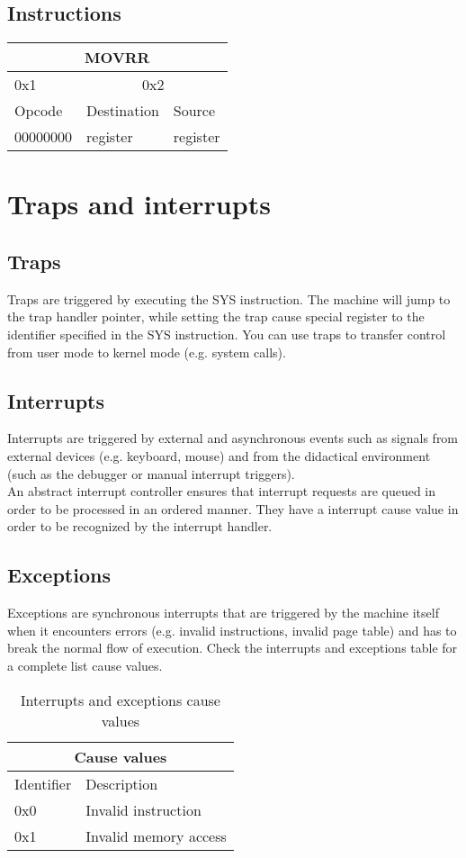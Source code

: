 \documentclass{article}
\begin{document}
\subsection{Instructions}
\begin{table}[h!]
\centering
\begin{tabular} { | p{2cm} | | p{2cm} | p{2cm} |}
  \hline
  \multicolumn{3}{|c|}{MOVRR}\\
  \hline
  0x1 & \multicolumn{2}{|c|}{0x2}\\
  \hline
  Opcode & Destination & Source\\
  00000000 & register & register\\
  \hline
\end{tabular}
\end{table}

\section{Traps and interrupts}
\subsection{Traps}
Traps are triggered by executing the SYS instruction. The machine will jump to the trap handler pointer, while setting the trap cause special register to the identifier specified in the SYS instruction. You can use traps to transfer control from user mode to kernel mode (e.g. system calls).
\subsection{Interrupts}
Interrupts are triggered by external and asynchronous events such as signals from external devices (e.g. keyboard, mouse) and from the didactical environment (such as the debugger or manual interrupt triggers). \\An abstract interrupt controller ensures that interrupt requests are queued in order to be processed in an ordered manner. They have a interrupt cause value in order to be recognized by the interrupt handler.
\subsection{Exceptions}
Exceptions are synchronous interrupts that are triggered by the machine itself when it encounters errors (e.g. invalid instructions, invalid page table) and has to break the normal flow of execution. Check the interrupts and exceptions table for a complete list cause values.
\\

\begin{table}[h!]
\centering
\begin{tabular} { | p{6cm} | p{6cm} |}
  \hline
  \multicolumn{2}{|c|}{Cause values}\\
  \hline
  Identifier & Description\\
  \hline  
  0x0 & Invalid instruction\\
  0x1 & Invalid memory access \\
  
  \hline
  
\end{tabular}
\caption{Interrupts and exceptions cause values}
\end{table}
\end{document}
